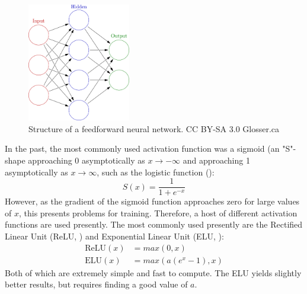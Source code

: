 \begin{figure}[htbp]
    \centering
    \includegraphics[width=0.4\textwidth]{images/neuralnetwork.png}
    \caption{Structure of a feedforward neural network. CC BY-SA 3.0 Glosser.ca}
    \label{fig:nnstructure}
\end{figure}

In the past, the most commonly used activation function was a sigmoid (an "S"-shape approaching 0 asymptotically as $x \rightarrow -\infty$ and approaching 1 asymptotically as $x \rightarrow \infty$, such as the logistic function (\cite{nnbookfour}):
\begin{equation}
    S(x) = \frac{1}{1+e^{-x}}
\end{equation}
However, as the gradient of the sigmoid function approaches zero for large values of $x$, this presents problems for training. Therefore, a host of different activation functions are used presently. The most commonly used presently are the Rectified Linear Unit (ReLU, \cite{Relu}) and Exponential Linear Unit (ELU, \cite{ELU}):
\begin{align}
    \mathrm{ReLU}(x) &= max(0, x) \\
    \mathrm{ELU}(x) &= max(a(e^x-1), x)
\end{align}
Both of which are extremely simple and fast to compute. The ELU yields slightly better results, but requires finding a good value of $a$. \\

